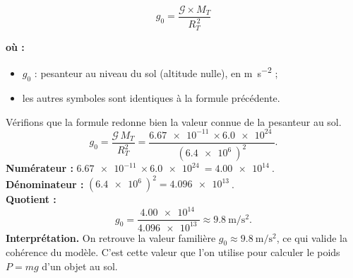 \documentclass[11pt,a4paper]{article}
\newenvironment{ou}{%
  \par\smallskip\noindent\textbf{où :}\nopagebreak
  \begin{itemize}[leftmargin=1.8em,topsep=2pt,itemsep=1.5pt,parsep=0pt]}%
  {\end{itemize}}
\newcommand{\Grav}{\mathcal{G}}        %
\begin{document}
\begin{formule}
\[
\boxed{\;g_0=\dfrac{\Grav\times M_T}{R_T^{\,2}}\;}
\]
\begin{ou}
  \item $g_0$ : pesanteur au niveau du sol (altitude nulle), en \si{\metre\per\second\squared} ;
  \item les autres symboles sont identiques à la formule précédente.
\end{ou}
\end{formule}

\begin{exemple}
Vérifions que la formule redonne bien la valeur connue de la pesanteur au sol.
\[
g_0=\frac{\Grav\,M_T}{R_T^2}
   =\frac{\SI{6.67e-11}{}\times\SI{6.0e24}{}}{(\SI{6.4e6}{})^2}.
\]
\textbf{Numérateur :} $\SI{6.67e-11}{}\times\SI{6.0e24}{}=\SI{4.00e14}{}$.\\
\textbf{Dénominateur :} $(\SI{6.4e6}{})^2=\SI{4.096e13}{}$.\\
\textbf{Quotient :}
\[
g_0=\frac{\SI{4.00e14}{}}{\SI{4.096e13}{}}\approx\SI{9.8}{\metre\per\second\squared}.
\]
\textbf{Interprétation.} On retrouve la valeur familière $g_0\approx\SI{9.8}{\metre\per\second\squared}$,
ce qui valide la cohérence du modèle. C'est cette valeur que l'on utilise pour calculer
le poids $P=mg$ d'un objet au sol.
\end{exemple}
\end{document}
